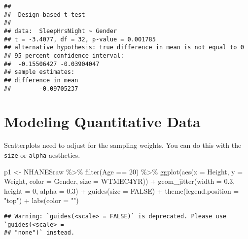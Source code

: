 \documentclass[
]{book}
\newenvironment{Shaded}{\begin{snugshade}}{\end{snugshade}}
\newcommand{\AttributeTok}[1]{\textcolor[rgb]{0.77,0.63,0.00}{#1}}
\newcommand{\ConstantTok}[1]{\textcolor[rgb]{0.00,0.00,0.00}{#1}}
\newcommand{\DecValTok}[1]{\textcolor[rgb]{0.00,0.00,0.81}{#1}}
\newcommand{\FloatTok}[1]{\textcolor[rgb]{0.00,0.00,0.81}{#1}}
\newcommand{\FunctionTok}[1]{\textcolor[rgb]{0.00,0.00,0.00}{#1}}
\newcommand{\NormalTok}[1]{#1}
\newcommand{\OtherTok}[1]{\textcolor[rgb]{0.56,0.35,0.01}{#1}}
\newcommand{\SpecialCharTok}[1]{\textcolor[rgb]{0.00,0.00,0.00}{#1}}
\newcommand{\StringTok}[1]{\textcolor[rgb]{0.31,0.60,0.02}{#1}}
\theoremstyle{definition}
\theoremstyle{definition}
\theoremstyle{definition}
\theoremstyle{definition}
\theoremstyle{remark}
\begin{document}
\begin{verbatim}
## 
##  Design-based t-test
## 
## data:  SleepHrsNight ~ Gender
## t = -3.4077, df = 32, p-value = 0.001785
## alternative hypothesis: true difference in mean is not equal to 0
## 95 percent confidence interval:
##  -0.15506427 -0.03904047
## sample estimates:
## difference in mean 
##        -0.09705237
\end{verbatim}

\hypertarget{modeling-quantitative-data}{%
\section{Modeling Quantitative Data}\label{modeling-quantitative-data}}

Scatterplots need to adjust for the sampling weights. You can do this with the \texttt{size} or \texttt{alpha} aesthetics.

\begin{Shaded}
\begin{Highlighting}[]
\NormalTok{p1 }\OtherTok{\textless{}{-}}\NormalTok{ NHANESraw }\SpecialCharTok{\%\textgreater{}\%} 
  \FunctionTok{filter}\NormalTok{(Age }\SpecialCharTok{==} \DecValTok{20}\NormalTok{) }\SpecialCharTok{\%\textgreater{}\%}
  \FunctionTok{ggplot}\NormalTok{(}\FunctionTok{aes}\NormalTok{(}\AttributeTok{x =}\NormalTok{ Height, }\AttributeTok{y =}\NormalTok{ Weight, }\AttributeTok{color =}\NormalTok{ Gender, }\AttributeTok{size =}\NormalTok{ WTMEC4YR)) }\SpecialCharTok{+}
  \FunctionTok{geom\_jitter}\NormalTok{(}\AttributeTok{width =} \FloatTok{0.3}\NormalTok{, }\AttributeTok{height =} \DecValTok{0}\NormalTok{, }\AttributeTok{alpha =} \FloatTok{0.3}\NormalTok{) }\SpecialCharTok{+}
  \FunctionTok{guides}\NormalTok{(}\AttributeTok{size =} \ConstantTok{FALSE}\NormalTok{) }\SpecialCharTok{+}
  \FunctionTok{theme}\NormalTok{(}\AttributeTok{legend.position =} \StringTok{"top"}\NormalTok{) }\SpecialCharTok{+}
  \FunctionTok{labs}\NormalTok{(}\AttributeTok{color =} \StringTok{""}\NormalTok{)}
\end{Highlighting}
\end{Shaded}

\begin{verbatim}
## Warning: `guides(<scale> = FALSE)` is deprecated. Please use `guides(<scale> =
## "none")` instead.
\end{verbatim}
\end{document}
